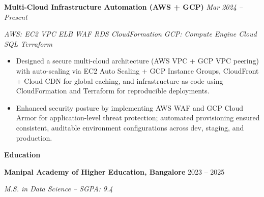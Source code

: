 \documentclass[
]{article}
\begin{document}
%
%

\textbf{Multi-Cloud Infrastructure Automation (AWS + GCP)} \hfill \emph{Mar 2024 -- Present}
\vspace{-0.5em}

\emph{AWS: EC2 \textbar{} VPC \textbar{} ELB \textbar{} WAF \textbar{}
RDS \textbar{} CloudFormation \textbar{} GCP: Compute Engine \textbar{}
Cloud SQL \textbar{} Terraform}

\begin{itemize}
\item
  Designed a secure multi-cloud architecture (AWS VPC + GCP VPC peering)
  with auto-scaling via EC2 Auto Scaling + GCP Instance Groups,
  CloudFront + Cloud CDN for global caching, and infrastructure-as-code
  using CloudFormation and Terraform for reproducible deployments.
\item
  Enhanced security posture by implementing AWS WAF and GCP Cloud Armor
  for application-level threat protection; automated provisioning
  ensured consistent, auditable environment configurations across dev,
  staging, and production.
\end{itemize}
\vspace{-0.3em}

\begin{center}\textbf{Education}\end{center}
\vspace{-0.3em}

\textbf{Manipal Academy of Higher Education, Bangalore} 2023 -- 2025

\emph{M.S. in Data Science -- SGPA: 9.4}

%
\vspace{-0.9em}
\end{document}
